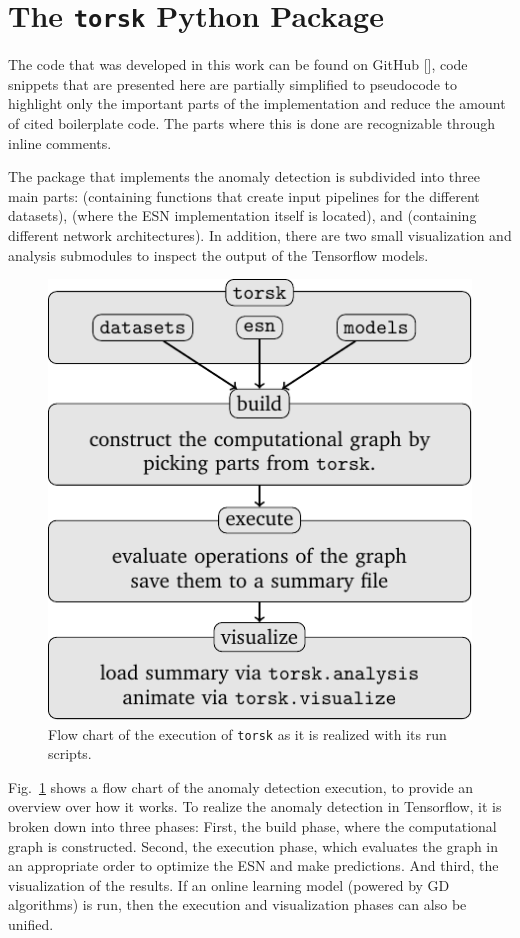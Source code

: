 \section{The \texttt{torsk} Python Package}%
\label{sec:torsk}

The code that was developed in this work can be found on GitHub
[\cite{coderepo}], code snippets that are presented here are partially simplified
to pseudocode to highlight only the important parts of the implementation and
reduce the amount of cited boilerplate code. The parts where this is done are
recognizable through inline comments.

The package that implements the anomaly detection is subdivided into three main
parts:  (containing functions that create input pipelines
for the different datasets),  (where the ESN implementation
itself is located), and  (containing different network
architectures). In addition, there are two small visualization and analysis
submodules to inspect the output of the Tensorflow models.

\begin{figure}
  \centering
  \includegraphics[width=0.5\linewidth]{tikz/flow.pdf}
  \caption{Flow chart of the execution of \texttt{torsk} as it is realized with
  its run scripts.}
  \label{fig:flowchart}
\end{figure}

Fig.~\ref{fig:flowchart} shows a flow chart of the anomaly detection
execution, to provide an overview over how it works.  To realize the
anomaly detection in Tensorflow, it is broken down into three phases: First,
the build phase, where the computational graph is constructed. Second, the
execution phase, which evaluates the graph in an appropriate order to optimize
the ESN and make predictions. And third, the visualization of the results.  If
an online learning model (powered by GD algorithms) is run, then the execution
and visualization phases can also be unified.


